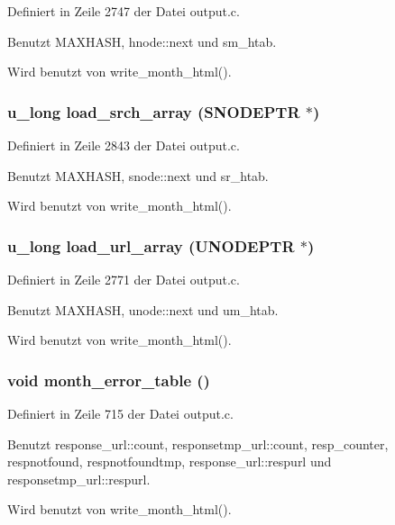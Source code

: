 Definiert in Zeile 2747 der Datei output.c.

Benutzt MAXHASH, hnode::next und sm\_\-htab.

Wird benutzt von write\_\-month\_\-html().
\subsubsection{\setlength{\rightskip}{0pt plus 5cm}u\_\-long load\_\-srch\_\-array ({\bf SNODEPTR} $\ast$)}\label{output_8c_d3eb19f2c468e374066739cccec7d3d4}




Definiert in Zeile 2843 der Datei output.c.

Benutzt MAXHASH, snode::next und sr\_\-htab.

Wird benutzt von write\_\-month\_\-html().
\subsubsection{\setlength{\rightskip}{0pt plus 5cm}u\_\-long load\_\-url\_\-array ({\bf UNODEPTR} $\ast$)}\label{output_8c_0d5c8398a3b959aa372077fda3f78fff}




Definiert in Zeile 2771 der Datei output.c.

Benutzt MAXHASH, unode::next und um\_\-htab.

Wird benutzt von write\_\-month\_\-html().
\subsubsection{\setlength{\rightskip}{0pt plus 5cm}void month\_\-error\_\-table ()}\label{output_8c_267f41fceee149a1e7eeb4ee30ee5f09}




Definiert in Zeile 715 der Datei output.c.

Benutzt response\_\-url::count, responsetmp\_\-url::count, resp\_\-counter, respnotfound, respnotfoundtmp, response\_\-url::respurl und responsetmp\_\-url::respurl.

Wird benutzt von write\_\-month\_\-html().
